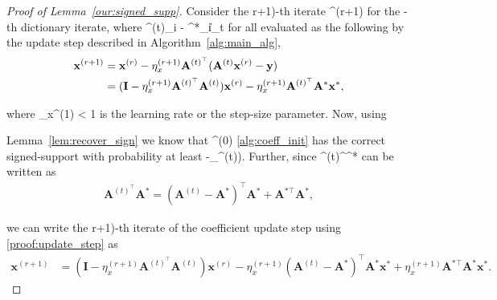 \documentclass{article}
\newcommand{\HT}{{\c{T}}}
\def\[#1\]{{$#1$}}
\def\b#1{{\mathbf{#1}}}
\def\c#1{{\mathcal{#1}}}
\begin{document}
\begin{proof}[Proof of Lemma~\ref{our:signed_supp}]
	

	






	Consider the \[(r+1)\]-th iterate \[\b{x}^{(r+1)}\] for the \[t\]-th dictionary iterate, where \[\|\b{A}^{(t)}_i - \b{A}^*_i\|\leq \epsilon_t\] for all \[i \in [1, m]\] evaluated as the following by the update step described in Algorithm~\ref{alg:main_alg},
	\begin{align}
	\label{proof:update_step}
	\b{x}^{(r+1)} &= \b{x}^{(r)} - \eta_{x}^{(r+1)}\b{A}^{(t)^\top}(\b{A}^{(t)}\b{x}^{(r)} - \b{y}) \notag\\
	&= (\b{I} - \eta_{x}^{(r+1)}\b{A}^{(t)^\top}\b{A}^{(t)})\b{x}^{(r)} - \eta_{x}^{(r+1)}\b{A}^{(t)^\top}\b{A}^*\b{x}^*,
	\end{align}
	
	where \[\eta_{x}^{(1)} < 1\] is the learning rate or the step-size parameter. Now, using 
	
	 Lemma~\ref{lem:recover_sign} we know that \[\b{x}^{(0)}\] \eqref{alg:coeff_init} has the correct signed-support with probability at least \[(1-\delta_\HT^{(t)})\]. 
	Further, since \[\b{A}^{(t)^\top}\b{A}^*\] can be written as
	\begin{align*}
\b{A}^{(t)^\top}\b{A}^* = (\b{A}^{(t)}- \b{A}^{*})^{\top}\b{A}^* + \b{A}^{*\top}\b{A}^*,
	\end{align*}
	
	we can write the \[(r+1)\]-th iterate of the coefficient update step using \eqref{proof:update_step} as
	\begin{align*}
	\b{x}^{(r+1)}
	&= (\b{I} - \eta_{x}^{(r+1)}\b{A}^{(t)^\top}\b{A}^{(t)})\b{x}^{(r)} - \eta_{x}^{(r+1)} (\b{A}^{(t)} -\b{A}^{*})^{\top}\b{A}^*\b{x}^* + \eta_{x}^{(r+1)} \b{A}^{*\top}\b{A}^*\b{x}^*.
	\end{align*}
	

\end{proof}
\end{document}
